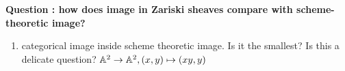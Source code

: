 \documentclass[./main.tex]{subfiles}
\begin{document}
\textbf{Question : how does image in Zariski sheaves
compare with scheme-theoretic image?}

\begin{enumerate}
  \item categorical image inside scheme theoretic image.
  Is it the smallest?
  Is this a delicate question?
  $\mathbb{A}^2 \to \mathbb{A}^2 , (x , y) \mapsto (xy , y)$
\end{enumerate}
\end{document}
